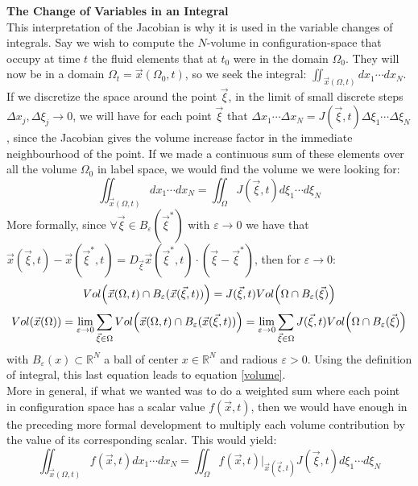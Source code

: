 \documentclass[11pt, a4paper]{article} %
\newcommand{\R}{\mathbb{R}} %
\DeclareRobustCommand{\mybox}[2][gray!10]{%
\begin{tcolorbox}[   %
        left=0.2cm,
        right=0.2cm,
        top=0.15cm,
        bottom=0.15cm,
        colback=#1,
        colframe=#1,
        width=\dimexpr\textwidth\relax, 
        enlarge left by=0mm,
        boxsep=5pt,
        arc=0pt,outer arc=0pt,
        ]
        #2
\end{tcolorbox}
}
\begin{document}
\mybox{
{\bf The Change of Variables in an Integral\vspace{0.2cm}\\}
This interpretation of the Jacobian is why it is used in the variable changes of integrals. Say we wish to compute the $N$-volume in configuration-space that occupy at time $t$ the fluid elements that at $t_0$ were in the domain $\Omega_0$. They will now be in a domain $\Omega_t=\vec{x}(\Omega_0,t)$, so we seek the integral: $\iint_{\vec{x}(\Omega,t)}dx_1\cdots dx_N$. If we discretize the space around the point $\vec{\xi}$, in the limit of small discrete steps $\Delta x_j, \Delta \xi_j \rightarrow 0$, we will have for each point $\vec{\xi}$ that $\Delta x_1\cdots \Delta x_N= J(\vec{\xi},t)\Delta \xi_1\cdots \Delta\xi_N$, since the Jacobian gives the volume increase factor in the immediate neighbourhood of the point. If we made a continuous sum of these elements over all the volume $\Omega_0$ in label space, we would find the volume we were looking for:
\begin{equation}\label{volume}
\iint_{\vec{x}(\Omega,t)}dx_1\cdots dx_N=\iint_{\Omega} J(\vec{\xi},t) d\xi_1\cdots d\xi_N
\end{equation}
More formally, since $\forall \vec{\xi}\in B_\varepsilon(\vec{\xi}^*)$ with $\varepsilon\rightarrow 0$ we have that $\vec{x}(\vec{\xi},t)-\vec{x}(\vec{\xi}^*,t)= D_{\vec{\xi}}\vec{x}(\vec{\xi}^*,t)\cdot (\vec{\xi}-\vec{\xi}^*)$, then for $\varepsilon \rightarrow 0$:
\begin{equation}
Vol\qty(\vec{x}(\Omega,t)\cap B_\varepsilon(\vec{x}(\vec{\xi},t)))=J(\vec{\xi},t)Vol\qty(\Omega \cap B_\varepsilon (\vec{\xi}))
\end{equation}
\begin{equation}
Vol\qty(\vec{x}(\Omega))=\lim_{ \varepsilon\rightarrow 0} \sum_{\vec{\xi}\in\Omega} Vol\qty(\vec{x}(\Omega,t)\cap B_\varepsilon(\vec{x}(\vec{\xi},t)))=\lim_{ \varepsilon\rightarrow 0} \sum_{\vec{\xi}\in\Omega} J(\vec{\xi},t)Vol\qty(\Omega \cap B_\varepsilon (\vec{\xi}))
\end{equation}
with $B_\varepsilon(x)\subset \R^N$ a ball of center $x\in\R^N$ and radious $\varepsilon>0$. Using the definition of integral, this last equation leads to equation \eqref{volume}.\\

More in general, if what we wanted was to do a weighted sum where each point in configuration space has a scalar value $f(\vec{x},t)$, then we would have enough in the preceding more formal development to multiply each volume contribution by the value of its corresponding scalar. This would yield:
\begin{equation}\label{integralChange}
\iint_{\vec{x}(\Omega,t)}f(\vec{x},t)dx_1\cdots dx_N=\iint_{\Omega} f(\vec{x},t)\Big\rvert_{\vec{x}(\vec{\xi},t)}J(\vec{\xi},t) d\xi_1\cdots d\xi_N
\end{equation}

}
\end{document}
